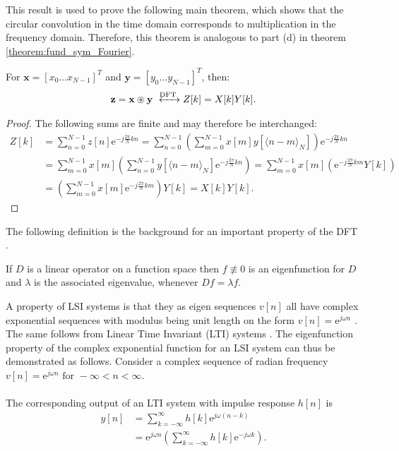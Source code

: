 This result is used to prove the following main theorem, which shows that the circular convolution in the time domain corresponds to multiplication in the frequency domain. Therefore, this theorem is analogous to part (d) in theorem \ref{theorem:fund_sym_Fourier}.

\begin{theorem}
For $\textbf{x} = [x_0 \dots x_{N-1}]^T$ and $\textbf{y} = [y_0 \dots y_{N-1}]^T$, then:
\begin{align*}
\textbf{z} = \textbf{x} \circledast \textbf{y} \xleftrightarrow{\text{DFT}} Z[k] = X[k] Y[k].
\end{align*}
\end{theorem}

\begin{proof}
The following sums are finite and may therefore be interchanged:
\begin{align*}
Z[k] &= \sum_{n=0}^{N-1} z[n] \text{e}^{-j\frac{2\pi}{N}kn} = \sum_{n=0}^{N-1} \left( \sum_{m=0}^{N-1} x[m] y[\langle n-m\rangle_N] \right) \text{e}^{-j\frac{2\pi}{N}kn} \\
&= \sum_{m=0}^{N-1} x[m] \left( \sum_{n=0}^{N-1} y[\langle n-m\rangle_N]\text{e}^{-j\frac{2\pi}{N}kn} \right) = \sum_{m=0}^{N-1} x[m] \left( \text{e}^{-j\frac{2\pi}{N}km}Y[k] \right) \\
&= \left( \sum_{m=0}^{N-1} x[m] \text{e}^{-j\frac{2\pi}{N}km} \right)Y[k] = X[k] Y[k].
\end{align*}
\end{proof}

The following definition is the background for an important property of the DFT \cite{Eigenfunctions}.

\begin{definition}[Eigenfunction]
If $D$ is a linear operator on a function space then $f \not\equiv 0$ is an eigenfunction for $D$ and $\lambda$ is the associated eigenvalue, whenever $Df = \lambda f$.
\end{definition}

A property of LSI systems is that they as eigen sequences $v[n]$ all have complex exponential sequences with modulus being unit length on the form $v[n] = \text{e}^{j \omega n}$ \cite{FSP}.\\ The same follows from Linear Time Invariant (LTI) systems \cite{DTSP}.
The eigenfunction property of the complex exponential function for an LSI system can thus be demonstrated as follows. Consider a complex sequence of radian frequency $v[n] = \text{e}^{j\omega n} \text{ for } -\infty < n < \infty$.
\\\\
The corresponding output of an LTI system with impulse response $h[n]$ is
\begin{align*}
y[n] 
&= \sum_{k=-\infty}^{\infty} h[k]\text{e}^{j\omega(n-k)} \nonumber \\ 
&= \text{e}^{j\omega n} \left(\sum_{k=-\infty}^{\infty} h[k]\text{e}^{-j\omega k} \right).
\end{align*}

